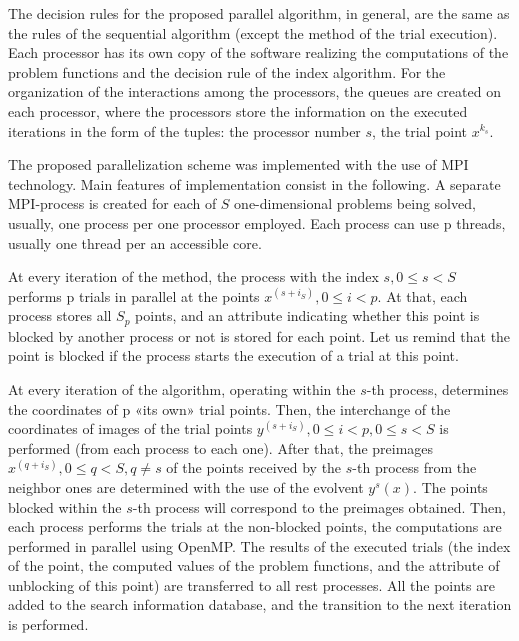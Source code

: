 \documentclass[runningheads]{llncs}
\begin{document}
The decision rules for the proposed parallel algorithm, in general, are the same as the rules of the sequential algorithm (except the method of the trial execution). Each processor has its own copy of the software realizing the computations of the problem functions and the decision rule of the index algorithm. For the organization of the interactions among the processors, the queues are created on each processor, where the processors store the information on the executed iterations in the form of the tuples: the processor number \(s\), the trial point \(x{}^{k_s}\).
\par
The proposed parallelization scheme was implemented with the use of MPI technology. Main features of implementation consist in the following. A separate MPI-process is created for each of \(S\) one-dimensional problems being solved, usually, one process per one processor employed. Each process can use p threads, usually one thread per an accessible core.
\par
At every iteration of the method, the process with the index \(s,0\leqslant s< S\) performs p trials in parallel at the points \(x^{(s+i_S)},0\leqslant i<p\). At that, each process stores all \(S_p\) points, and an attribute indicating whether this point is blocked by another process or not is stored for each point. Let us remind that the point is blocked if the process starts the execution of a trial at this point.
\par
At every iteration of the algorithm, operating within the \(s\)-th process, determines the coordinates of p «its own» trial points. Then, the interchange of the coordinates of images of the trial points \(y^{(s+i_S)},0\leqslant i<p, 0\leqslant s< S\) is performed (from each process to each one). After that, the preimages \(x^{(q+i_S)},0\leqslant q<S,q\not=s\) of the points received by the \(s\)-th process from the neighbor ones are determined with the use of the evolvent \(y^s (x)\). The points blocked within the \(s\)-th process will correspond to the preimages obtained. Then, each process performs the trials at the non-blocked points, the computations are performed in parallel using OpenMP. The results of the executed trials (the index of the point, the computed values of the problem functions, and the attribute of unblocking of this point) are transferred to all rest processes. All the points are added to the search information database, and the transition to the next iteration is performed.
\par

\end{document}
